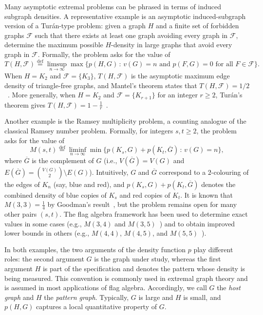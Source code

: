 \documentclass{article}
\newcommand*{\defeq}{\stackrel{\mathrm{def}}{=}}
\begin{document}
Many asymptotic extremal problems can be phrased in terms of induced subgraph densities.
A representative example is an asymptotic induced-subgraph version of a Tur\'an-type problem: given a graph $H$
and a finite set of forbidden graphs $\mathcal{F}$ such that there exists at least one graph avoiding every graph in $\mathcal{F}$, determine the maximum possible $H$-density in large
graphs that avoid every graph in $\mathcal{F}$. Formally, the problem asks for the value of
\[
T(H, \mathcal{F}) \defeq
\limsup_{n \to \infty} \max \{ p(H, G) \,:\, v(G) = n \text{ and } p(F,G) = 0 \text{ for all } F \in \mathcal{F} \}.
\]
When $H = K_2$ and $\mathcal{F} = \{K_3\}$, $T(H,\mathcal{F})$ is the asymptotic maximum edge density
of triangle-free graphs, and Mantel's theorem states that $T(H,\mathcal{F}) = 1/2$~\cite{Mantel1907}.
More generally, when $H = K_2$ and $\mathcal{F} = \{K_{r+1}\}$ for an integer $r \geq 2$, Tur\'an's
theorem gives $T(H,\mathcal{F}) = 1 - \frac{1}{r}$~\cite{Turan1941}.

Another example is the Ramsey multiplicity problem, a counting analogue of the classical Ramsey
number problem. Formally, for integers $s,t \geq 2$, the problem asks for the value of
\[
M(s,t) \defeq
\liminf_{n \to \infty} \min \{ p(K_s, G) + p(K_t, \overline{G}) \,:\, v(G) = n \},
\]
where $\overline{G}$ is the complement of $G$ (i.e., $V(\overline{G}) = V(G)$ and
$E(\overline{G}) = \binom{V(G)}{2} \setminus E(G)$). Intuitively, $G$ and $\overline{G}$ correspond
to a $2$-colouring of the edges of $K_n$ (say, blue and red), and $p(K_s, G) + p(K_t, \overline{G})$
denotes the combined density of blue copies of $K_s$ and red copies of $K_t$. It is known that
$M(3,3) = \frac{1}{4}$ by Goodman's result~\cite{Goodman1959}, but the problem remains open for many
other pairs $(s,t)$. The flag algebra framework has been used to determine exact values in some
cases (e.g., $M(3,4)$ and $M(3,5)$~\cite{Parczyk2025new}) and to obtain improved lower bounds in
others (e.g., $M(4,4)$, $M(4,5)$, and $M(5,5)$~\cite{Grzesik22tripartite,Parczyk2025new}).

In both examples, the two arguments of the density function $p$ play different roles: the second argument $G$ is the graph under study, whereas the first argument $H$ is part of the specification and denotes the pattern whose density is being measured. This convention is commonly used in extremal graph theory and is assumed in most applications of flag algebra. Accordingly, we call $G$ the \emph{host graph} and $H$ the \emph{pattern graph}. Typically, $G$ is large and $H$ is small, and $p(H,G)$ captures a local quantitative property of $G$.
\end{document}
